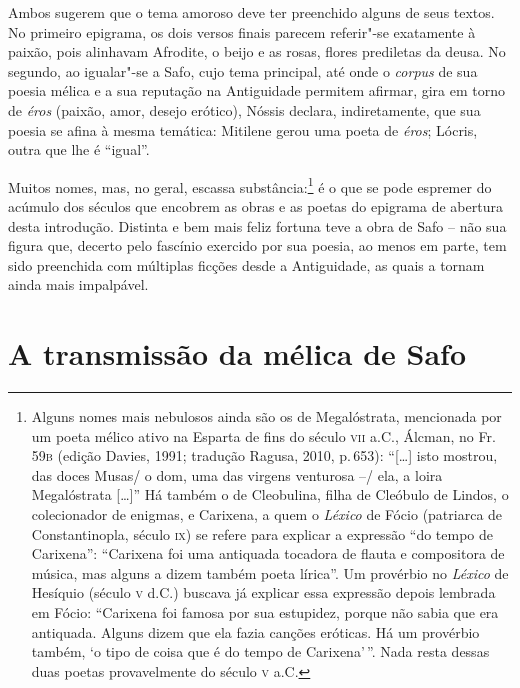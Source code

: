 Ambos sugerem que o tema amoroso deve ter preenchido alguns de seus textos. No
primeiro epigrama, os dois versos finais parecem referir"-se exatamente à
paixão, pois alinhavam Afrodite, o beijo e as rosas, flores prediletas da
deusa. No segundo, ao igualar"-se a Safo, cujo tema principal, até onde o
\textit{corpus} de sua poesia mélica e a sua reputação na Antiguidade permitem
afirmar, gira em torno de \textit{éros} (paixão, amor, desejo erótico), Nóssis
declara, indiretamente, que sua poesia se afina à mesma temática: Mitilene
gerou uma poeta de \textit{éros}; Lócris, outra que lhe é ``igual”.

Muitos nomes, mas, no geral, escassa substância:\footnote{Alguns nomes mais nebulosos ainda são
os de Megalóstrata, mencionada por um poeta mélico ativo na Esparta de fins do
século \textsc{vii} a.C., Álcman, no Fr.\,59\textsc{b} (edição Davies, 1991;
tradução Ragusa, 2010, p.\,653): ``{[}\ldots{}{]} isto mostrou, das doces
Musas/ o dom, uma das virgens venturosa --/ ela, a loira Megalóstrata {[}\ldots{}{]}'' Há
também o de Cleobulina, filha de Cleóbulo de Lindos, o colecionador de enigmas,
e Carixena, a quem o \textit{Léxico} de Fócio (patriarca de Constantinopla,
século \textsc{ix}) se refere para explicar a expressão ``do tempo de Carixena”:
``Carixena foi uma antiquada tocadora de flauta e compositora de música,
mas alguns a dizem também poeta lírica”. Um provérbio no \textit{Léxico} de
Hesíquio (século \textsc{v} d.C.) buscava já explicar essa expressão depois lembrada em
Fócio: ``Carixena foi famosa por sua estupidez, porque não sabia que era
antiquada. Alguns dizem que ela fazia canções eróticas. Há um provérbio também,
‘o tipo de coisa que é do tempo de Carixena’\,”. Nada resta dessas duas poetas
provavelmente do século \textsc{v} a.C.} é o que se pode espremer do acúmulo dos
séculos que encobrem as obras e as poetas do epigrama de abertura desta
introdução. Distinta e bem mais feliz fortuna teve a obra de Safo -- não sua
figura que, decerto pelo fascínio exercido por sua poesia, ao menos em parte,
tem sido preenchida com múltiplas ficções desde a Antiguidade, as quais a
tornam ainda mais impalpável. 

\section*{A transmissão da mélica de Safo}


